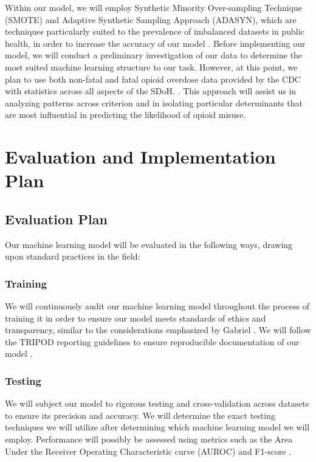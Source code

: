 \documentclass[journal]{IEEEtran}
\begin{document}
    Within our model, we will employ Synthetic Minority Over-sampling Technique (SMOTE) and Adaptive Synthetic Sampling Approach (ADASYN), which are techniques particularly suited to the prevalence of imbalanced datasets in public health, in order to increase the accuracy of our model \cite{partonMachineLearningApproach2026, chawlaSMOTESyntheticMinority2002, heADASYNAdaptiveSynthetic2008}. Before implementing our model, we will conduct a preliminary investigation of our data to determine the most suited machine learning structure to our task. However, at this point, we plan to use both non-fatal and fatal opioid overdose data provided by the CDC with statistics across all aspects of the SDoH. \cite{cdcDOSESYSDashboardNonfatal2026, cdcSUDORSDashboardFatal2026}. This approach will assist us in analyzing patterns across criterion and in isolating particular determinants that are most influential in predicting the likelihood of opioid misuse.


    \section{Evaluation and Implementation Plan}

    \subsection{Evaluation Plan}

    Our machine learning model will be evaluated in the following ways, drawing upon standard practices in the field:

    \subsubsection{Training}

    We will continuously audit our machine learning model throughout the process of training it in order to ensure our model meets standards of ethics and transparency, similar to the considerations emphasized by Gabriel \cite{gabrielReviewLeveragingArtificial2025, ramirezmedinaSystematicReviewMachine2025}. We will follow the TRIPOD reporting guidelines to ensure reproducible documentation of our model \cite{moonsTransparentReportingMultivariable2015}.

    \subsubsection{Testing}

    We will subject our model to rigorous testing and cross-validation across datasets to ensure its precision and accuracy. We will determine the exact testing techniques we will utilize after determining which machine learning model we will employ. Performance will possibly be assessed using metrics such as the Area Under the Receiver Operating Characteristic curve (AUROC) and F1-score \cite{taiUtilizingMachineLearning2025, partonMachineLearningApproach2026}.
\end{document}
